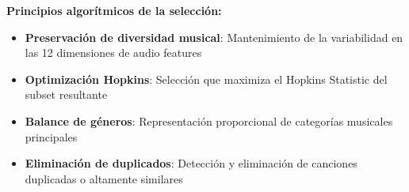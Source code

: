 \documentclass[12pt,a4paper]{report}
\begin{document}
\textbf{Principios algorítmicos de la selección:}
\begin{itemize}[leftmargin=*]
    \item \textbf{Preservación de diversidad musical}: Mantenimiento de la variabilidad en las 12 dimensiones de audio features
    \item \textbf{Optimización Hopkins}: Selección que maximiza el Hopkins Statistic del subset resultante
    \item \textbf{Balance de géneros}: Representación proporcional de categorías musicales principales
    \item \textbf{Eliminación de duplicados}: Detección y eliminación de canciones duplicadas o altamente similares
\end{itemize}
\end{document}
